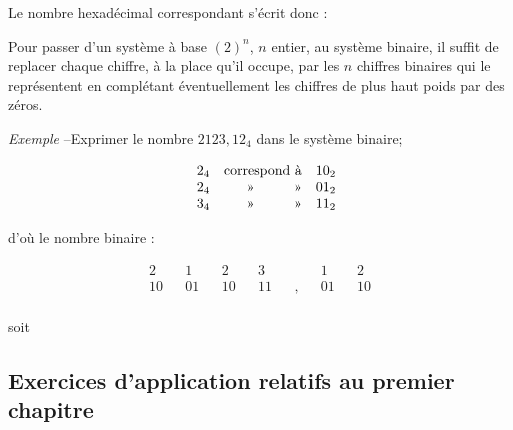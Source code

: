 Le nombre hexadécimal  correspondant s'écrit donc :   


Pour passer d'un système à base $(2)^n$, $n$ entier, au système binaire, il suffit de replacer chaque chiffre, à la place qu'il occupe, par les $n$ chiffres binaires qui le représentent en complétant éventuellement les chiffres de plus haut poids par des zéros.

\textsl{Exemple} --Exprimer le nombre $2123,12_4$ dans le système binaire; 

\[ \begin{array}{@{\hspace*{5mm}}ccl} 
2_4 & \text{correspond à}  & 10_2 \\ 
2_4 & \multicolumn{1}{r}{\text{»\hspace*{1cm}»}}  & 01_2 \\ 
3_4 & \multicolumn{1}{r}{\text{»\hspace*{1cm}»}}  & 11_2 \\ 
\end{array} 
\]


d'où le nombre binaire : 
\medskip

\[
\begin{array}{ccccccccccccc}
2 && 1 && 2 && 3 && && 1 && 2 \\
10 && 01 && 10 && 11 &&, && 01 && 10 \\
\end{array}
\]

soit \hfill {} \hfill

\newpage 

\subsection{Exercices d'application relatifs au premier chapitre}


